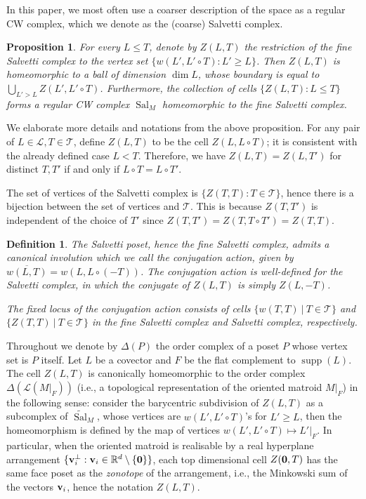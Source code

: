 \documentclass{amsart}
\newtheorem{proposition}[theorem]{Proposition}
\newtheorem{definition}[theorem]{Definition}
\newcommand\Lcal{{\mathcal L}}
\newcommand\Tcal{{\mathcal T}}
\DeclareMathOperator{\supp}{supp}
\DeclareMathOperator{\Sal}{Sal}
\begin{document}
{In this paper, we most often use a coarser description of the space as a regular CW complex, which we denote as the (coarse) Salvetti complex.

\begin{proposition}\label{prop:salComplex} \cite[Proposition 5.50]{OT_book}
For every $L\leq T$, denote by $Z(L,T)$ the restriction of the fine Salvetti complex to the vertex set $\{w(L',L'\circ T):L'\geq L\}$.
Then $Z(L,T)$ is homeomorphic to a ball of dimension $\dim L$, whose boundary is equal to $\bigcup_{L'>L} Z(L',L'\circ T)$.
Furthermore, the collection of cells $\{Z(L,T):L\leq T\}$ forms a regular CW complex $\Sal_M$ homeomorphic to the fine Salvetti complex.
\end{proposition}

We elaborate more details and notations from the above proposition.
For any pair of $L\in\Lcal, T\in\Tcal$, define $Z(L,T)$ to be the cell $Z(L,L\circ T)$; it is consistent with the already defined case $L<T$.
Therefore, we have $Z(L,T) = Z(L,T')$ for distinct $T,T'$ if and only if $L \circ T = L \circ T'$.

The set of vertices of the Salvetti complex is $\{Z(T,T):T\in\Tcal\}$, hence there is a bijection between the set of vertices and $\mathcal{T}$. This is because $Z(T,T')$ is independent of the choice of $T'$ since $ Z(T,T') = Z(T,T \circ T') = Z(T,T)$.

\begin{definition}\label{def:conj}
The Salvetti poset, hence the fine Salvetti complex, admits a canonical involution which we call \emph{the conjugation action}, given by $\overline{w(L,T)}=w(L,L\circ(-T))$. The conjugation action is well-defined for the Salvetti complex, in which the conjugate of $Z(L,T)$ is simply $Z(L,-T)$.

The fixed locus of the conjugation action consists of cells $\{w(T, T) \ | \ T \in \mathcal{T} \}$ and $\{Z(T,T) \ | \ T \in \mathcal{T} \}$ in the fine Salvetti complex and Salvetti complex, respectively.
\end{definition}

Throughout we denote by $\Delta(P)$ the order complex of a poset $P$ whose vertex set is $P$ itself. 
Let $L$ be a covector and $F$ be the flat complement to $\supp(L)$.
The cell $Z(L,T)$ is canonically homeomorphic to the order complex $\Delta(\Lcal(M|_F))$ (i.e., a topological representation of the oriented matroid $M|_F$) in the following sense:
consider the barycentric subdivision of $Z(L, T)$ as a subcomplex of $\widetilde{\Sal}_M$, whose vertices are $w(L',L'\circ T)$'s for $L'\geq L$, then the homeomorphism is defined by the map of vertices $w(L',L'\circ T)\mapsto L'|_F$.
In particular, when the oriented matroid is realisable by a real hyperplane arrangement $\{{\bf v}_i^\perp: {\bf v}_i\in\mathbb{R}^d\setminus\{{\bf 0}\}\}$, each top dimensional cell $Z({\bf 0},T)$ has the same face poset as the {\em zonotope} of the arrangement, i.e., the Minkowski sum of the vectors ${\bf v}_i$, hence the notation $Z(L,T)$.

}
\end{document}
